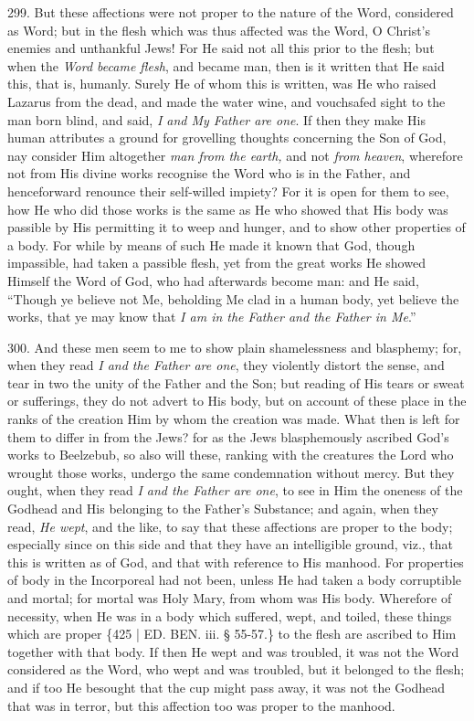 299.
But these affections were not proper to the nature of the Word,
considered as Word; but in the flesh which was thus affected was the
Word, O Christ's enemies and unthankful Jews! For He said not all this
prior to the flesh; but when the \emph{Word became flesh}, and became
man, then is it written that He said this, that is, humanly. Surely He
of whom this is written, was He who raised Lazarus from the dead, and
made the water wine, and vouchsafed sight to the man born blind, and
said, \emph{I and My Father are one}. If then they make His human
attributes a ground for grovelling thoughts concerning the Son of God,
nay consider Him altogether \emph{man from the earth,} and not \emph{from
heaven}, wherefore not from His divine works recognise the
Word who is in the Father, and henceforward renounce their self-willed
impiety? For it is open for them to see, how He who did those works is
the same as He who showed that His body was passible by His permitting
it to weep and hunger, and to show other properties of a body. For
while by means of such He made it known that God, though impassible,
had taken a passible flesh, yet from the great works He showed Himself
the Word of God, who had afterwards become man: and He said, ``Though
ye believe not Me, beholding Me clad in a human body, yet believe the
works, that ye may know that \emph{I am in the Father and the Father in
Me}.''

300.
And these men seem to me to show plain shamelessness and blasphemy;
for, when they read \emph{I and the Father are one}, they violently
distort the sense, and tear in two the unity of the Father and the
Son; but reading of His tears or sweat or sufferings, they do not
advert to His body, but on account of these place in the ranks of the
creation Him by whom the creation was made. What then is left for them
to differ in from the Jews? for as the Jews blasphemously ascribed God's
works to Beelzebub, so also will these, ranking with the creatures the
Lord who wrought those works, undergo the same condemnation without
mercy. But they ought, when they read \emph{I and the Father are one},
to see in Him the oneness of the Godhead and His belonging to the
Father's Substance; and again, when they read, \emph{He wept}, and the
like, to say that these affections are proper to the body; especially
since on this side and that they have an intelligible ground, viz.,
that this is written as of God, and that with reference to His
manhood. For properties of body in the Incorporeal had not been,
unless He had taken a body corruptible and mortal; for mortal was Holy
Mary, from whom was His body. Wherefore of necessity, when He was in a
body which suffered, wept, and toiled, these things which are proper
\{425 | ED.
BEN. iii. § 55-57.\} to the flesh are ascribed
to Him together with that body. If then He wept and was troubled, it
was not the Word considered as the Word, who wept and was troubled,
but it belonged to the flesh; and if too He besought that the cup
might pass away, it was not the Godhead that was in terror, but this
affection too was proper to the manhood.


